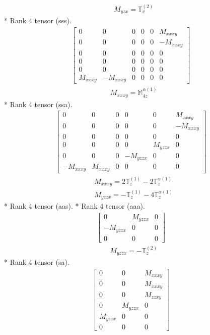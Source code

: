 \documentclass[fleqn,8pt,landscape]{jsarticle}
\begin{document}
\begin{align*}
& M_{yzx} = \mathbb{T}_{v}^{(2)}
\end{align*}
* Rank 4 tensor (sss).
\begin{align*}
\begin{bmatrix} 0 & 0 & 0 & 0 & 0 & M_{xxxy} \\ 0 & 0 & 0 & 0 & 0 & - M_{xxxy} \\ 0 & 0 & 0 & 0 & 0 & 0 \\ 0 & 0 & 0 & 0 & 0 & 0 \\ 0 & 0 & 0 & 0 & 0 & 0 \\ M_{xxxy} & - M_{xxxy} & 0 & 0 & 0 & 0 \end{bmatrix}
\end{align*}
\begin{align*}
& M_{xxxy} = \mathbb{M}_{4z}^{\alpha(1)}
\end{align*}
* Rank 4 tensor (ssa).
\begin{align*}
\begin{bmatrix} 0 & 0 & 0 & 0 & 0 & M_{xxxy} \\ 0 & 0 & 0 & 0 & 0 & - M_{xxxy} \\ 0 & 0 & 0 & 0 & 0 & 0 \\ 0 & 0 & 0 & 0 & M_{yzzx} & 0 \\ 0 & 0 & 0 & - M_{yzzx} & 0 & 0 \\ - M_{xxxy} & M_{xxxy} & 0 & 0 & 0 & 0 \end{bmatrix}
\end{align*}
\begin{align*}
& M_{xxxy} = 2 \mathbb{T}_{z}^{(1)} - 2 \mathbb{T}_{z}^{\alpha(1)} \\
& M_{yzzx} = - \mathbb{T}_{z}^{(1)} - 4 \mathbb{T}_{z}^{\alpha(1)}
\end{align*}
* Rank 4 tensor (aas).
* Rank 4 tensor (aaa).
\begin{align*}
\begin{bmatrix} 0 & M_{yzzx} & 0 \\ - M_{yzzx} & 0 & 0 \\ 0 & 0 & 0 \end{bmatrix}
\end{align*}
\begin{align*}
& M_{yzzx} = - \mathbb{T}_{z}^{(2)}
\end{align*}
* Rank 4 tensor (sa).
\begin{align*}
\begin{bmatrix} 0 & 0 & M_{xxxy} \\ 0 & 0 & M_{xxxy} \\ 0 & 0 & M_{zzxy} \\ 0 & M_{yzzx} & 0 \\ M_{yzzx} & 0 & 0 \\ 0 & 0 & 0 \end{bmatrix}
\end{align*}
\end{document}
